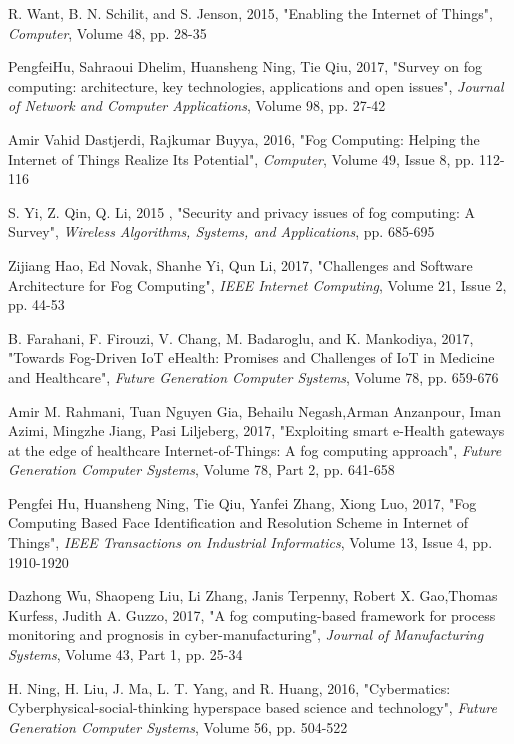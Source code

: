 \documentclass[10pt,a4paper,journal]{IEEEtran}
\begin{document}
\begin{thebibliography}{15}
	
    R. Want, B. N. Schilit, and S. Jenson, 2015, "Enabling the Internet of Things", \textit{Computer}, Volume 48, pp. 28-35

  PengfeiHu, Sahraoui Dhelim, Huansheng Ning, Tie Qiu, 2017, "Survey on fog computing: architecture, key technologies, applications and open issues", \textit{Journal of Network and Computer Applications}, Volume 98, pp. 27-42

  Amir Vahid Dastjerdi, Rajkumar Buyya, 2016, "Fog Computing: Helping the Internet of Things Realize Its Potential", \textit{Computer}, Volume 49, Issue 8, pp. 112-116

 S. Yi, Z. Qin, Q. Li, 2015 , "Security and privacy issues of fog computing: A Survey", \textit{Wireless Algorithms, Systems, and Applications}, pp. 685-695

 Zijiang Hao, Ed Novak,  Shanhe Yi, Qun Li, 2017, "Challenges and Software Architecture for Fog Computing", \textit{IEEE Internet Computing}, Volume 21, Issue 2, pp. 44-53

 B. Farahani, F. Firouzi, V. Chang, M. Badaroglu, and K. Mankodiya, 2017, "Towards Fog-Driven IoT eHealth: Promises and Challenges of IoT in Medicine and Healthcare", \textit{Future Generation Computer Systems}, Volume 78, pp. 659-676

 Amir M. Rahmani, Tuan Nguyen Gia, Behailu Negash,Arman Anzanpour, Iman Azimi, Mingzhe Jiang, Pasi Liljeberg, 2017, "Exploiting smart e-Health gateways at the edge of healthcare Internet-of-Things: A fog computing approach", \textit{Future Generation Computer Systems}, Volume 78, Part 2, pp. 641-658 

 Pengfei Hu, Huansheng Ning, Tie Qiu, Yanfei Zhang, Xiong Luo, 2017, "Fog Computing Based Face Identification and Resolution Scheme in Internet of Things", \textit{IEEE Transactions on Industrial Informatics}, Volume 13, Issue 4, pp. 1910-1920

 Dazhong Wu, Shaopeng Liu, Li Zhang, Janis Terpenny, Robert X. Gao,Thomas Kurfess, Judith A. Guzzo, 2017, "A fog computing-based framework for process monitoring and prognosis in cyber-manufacturing", \textit{Journal of Manufacturing Systems}, Volume 43, Part 1, pp. 25-34

 H. Ning, H. Liu, J. Ma, L. T. Yang, and R. Huang, 2016, "Cybermatics: Cyberphysical-social-thinking hyperspace based science and technology", \textit{Future Generation Computer Systems}, Volume 56, pp. 504-522


\end{thebibliography}
\end{document}
